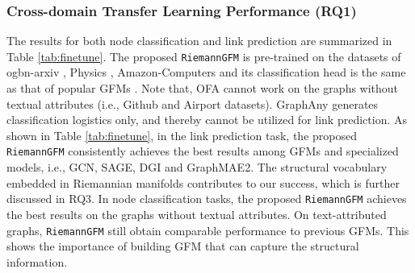 \subsubsection{\textbf{Cross-domain Transfer Learning Performance (RQ1)}}
The results for both node classification and link prediction are summarized in Table \ref{tab:finetune}. 
The proposed \texttt{RiemannGFM} is pre-trained on the datasets of ogbn-arxiv \cite{nips2020arxiv}, Physics \cite{physics_computers}, Amazon-Computers \cite{physics_computers} and its classification head is the same as that of popular GFMs \cite{xia2024opengraph,xia2024anygraph,kdd24gcope}.
Note that, OFA \cite{iclr24ofa} cannot work on the graphs without textual attributes (i.e., Github and Airport datasets). 
GraphAny \cite{zhao2024graphany} generates classification logistics only, and thereby cannot be utilized for link prediction.
As shown in Table \ref{tab:finetune}, in the link prediction task, the proposed \texttt{RiemannGFM} consistently achieves the best results among GFMs and specialized models, i.e., GCN, SAGE, DGI and GraphMAE2.
The structural vocabulary embedded in Riemannian manifolds contributes to our success, which is further discussed  in RQ3.
In node classification tasks, the proposed \texttt{RiemannGFM} achieves the best results on  the graphs without textual attributes. 
On text-attributed graphs,  \texttt{RiemannGFM} still obtain comparable performance to previous GFMs.
This shows the importance of building GFM that can capture the structural information.

